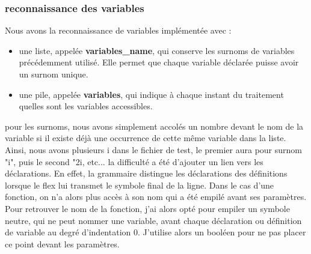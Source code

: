 \documentclass[10pt,a4paper]{report}
\begin{document}
\subsubsection*{reconnaissance des variables}
Nous avons la reconnaissance de variables implémentée avec :
\begin{itemize}
	\item une liste, appelée \textbf{variables\_name}, qui conserve les surnoms de variables précédemment utilisé. Elle permet que chaque variable déclarée puisse avoir un surnom unique.
	\item une pile, appelée \textbf{variables}, qui indique à chaque instant du traitement quelles sont les variables accessibles.
\end{itemize}
pour les surnoms, nous avons simplement accolés un nombre devant le nom de la variable si il existe déjà une occurrence  de cette même variable dans la liste. Ainsi, nous avons plusieurs i dans le fichier de test, le premier aura pour surnom "i", puis le second "2i, etc... \newline
la difficulté a été d'ajouter un lien vers les déclarations. En effet, la grammaire distingue les déclarations des définitions lorsque le flex lui transmet le symbole final de la ligne. \newline 
Dans le cas d'une fonction, on n'a alors plus accès à son nom qui a été empilé avant ses paramètres.
\newline 
Pour retrouver le nom de la fonction, j'ai alors opté pour empiler un symbole neutre, qui ne peut nommer une variable, avant chaque déclaration ou définition de variable au degré d'indentation 0. J'utilise alors un booléen pour ne pas placer ce point devant les paramètres. \newline
\end{document}
